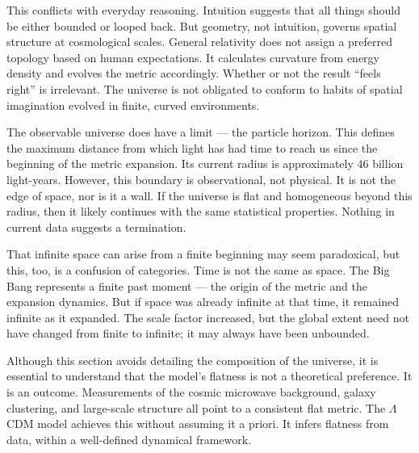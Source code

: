 This conflicts with everyday reasoning. Intuition suggests that all things should be either bounded or looped back. But geometry, not intuition, governs spatial structure at cosmological scales. General relativity does not assign a preferred topology based on human expectations. It calculates curvature from energy density and evolves the metric accordingly. Whether or not the result “feels right” is irrelevant. The universe is not obligated to conform to habits of spatial imagination evolved in finite, curved environments.

The observable universe does have a limit — the particle horizon. This defines the maximum distance from which light has had time to reach us since the beginning of the metric expansion. Its current radius is approximately 46 billion light-years. However, this boundary is observational, not physical. It is not the edge of space, nor is it a wall. If the universe is flat and homogeneous beyond this radius, then it likely continues with the same statistical properties. Nothing in current data suggests a termination.

That infinite space can arise from a finite beginning may seem paradoxical, but this, too, is a confusion of categories. Time is not the same as space. The Big Bang represents a finite past moment — the origin of the metric and the expansion dynamics. But if space was already infinite at that time, it remained infinite as it expanded. The scale factor increased, but the global extent need not have changed from finite to infinite; it may always have been unbounded.

Although this section avoids detailing the composition of the universe, it is essential to understand that the model’s flatness is not a theoretical preference. It is an outcome. Measurements of the cosmic microwave background, galaxy clustering, and large-scale structure all point to a consistent flat metric. The $\Lambda$CDM model achieves this without assuming it a priori. It infers flatness from data, within a well-defined dynamical framework.
